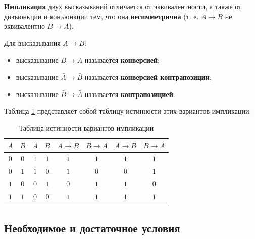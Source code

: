 \textbf{Импликация} двух высказываний отличается от эквивалентности, а также от дизъюнкции и конъюнкции тем, что она \textbf{несимметрична} (т. е. \(A \to B\) не эквивалентно \(B \to A\)).

Для высказывания \(A \to B\):
\begin{itemize}
    \item высказывание \(B \to A\) называется \textbf{конверсией};
    \item высказывание \(\bar{A} \to \bar{B}\) называется \textbf{конверсией контрапозиции};
    \item высказывание \(\bar{B} \to \bar{A}\) называется \textbf{контрапозицией}.
\end{itemize}

Таблица \ref{tab:truth-table-implication} представляет собой таблицу истинности этих вариантов импликации.

{
\renewcommand*{\arraystretch}{1.5}
\begin{longtable}{|c|c|c|c|c|c|c|c|}
    \hline
    \(A\) & \(B\) & \(\bar{A}\) & \(\bar{B}\) & \(A \to B\) & \(B \to A\) & \(\bar{A} \to \bar{B}\) & \(\bar{B} \to \bar{A}\) \\
    \hline
    \(0\) & \(0\) & \(1\)       & \(1\)       & \(1\)       & \(1\)       & \(1\)                   & \(1\)                   \\
    \hline
    \(0\) & \(1\) & \(1\)       & \(0\)       & \(1\)       & \(0\)       & \(0\)                   & \(1\)                   \\
    \hline
    \(1\) & \(0\) & \(0\)       & \(1\)       & \(0\)       & \(1\)       & \(1\)                   & \(0\)                   \\
    \hline
    \(1\) & \(1\) & \(0\)       & \(0\)       & \(1\)       & \(1\)       & \(1\)                   & \(1\)                   \\
    \hline
    \caption{Таблица истинности вариантов импликации}
    \label{tab:truth-table-implication}
\end{longtable}
}

\subsection{Необходимое и достаточное условия}

